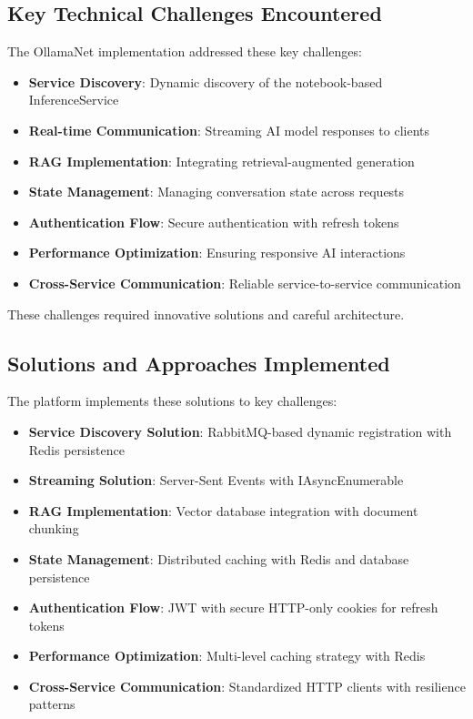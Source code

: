 \subsection{Key Technical Challenges Encountered}
The OllamaNet implementation addressed these key challenges:
\begin{itemize}
    \item \textbf{Service Discovery}: Dynamic discovery of the notebook-based InferenceService
    \item \textbf{Real-time Communication}: Streaming AI model responses to clients
    \item \textbf{RAG Implementation}: Integrating retrieval-augmented generation
    \item \textbf{State Management}: Managing conversation state across requests
    \item \textbf{Authentication Flow}: Secure authentication with refresh tokens
    \item \textbf{Performance Optimization}: Ensuring responsive AI interactions
    \item \textbf{Cross-Service Communication}: Reliable service-to-service communication
\end{itemize}

These challenges required innovative solutions and careful architecture.

\subsection{Solutions and Approaches Implemented}
The platform implements these solutions to key challenges:
\begin{itemize}
    \item \textbf{Service Discovery Solution}: RabbitMQ-based dynamic registration with Redis persistence
    \item \textbf{Streaming Solution}: Server-Sent Events with IAsyncEnumerable
    \item \textbf{RAG Implementation}: Vector database integration with document chunking
    \item \textbf{State Management}: Distributed caching with Redis and database persistence
    \item \textbf{Authentication Flow}: JWT with secure HTTP-only cookies for refresh tokens
    \item \textbf{Performance Optimization}: Multi-level caching strategy with Redis
    \item \textbf{Cross-Service Communication}: Standardized HTTP clients with resilience patterns
\end{itemize}


